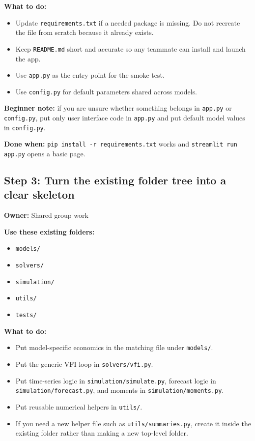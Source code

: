 \documentclass[11pt]{article}
\begin{document}
\textbf{What to do:}
\begin{itemize}
    \item Update \texttt{requirements.txt} if a needed package is missing. Do not recreate the file from scratch because it already exists.
    \item Keep \texttt{README.md} short and accurate so any teammate can install and launch the app.
    \item Use \texttt{app.py} as the entry point for the smoke test.
    \item Use \texttt{config.py} for default parameters shared across models.
\end{itemize}

\textbf{Beginner note:} if you are unsure whether something belongs in \texttt{app.py} or \texttt{config.py}, put only user interface code in \texttt{app.py} and put default model values in \texttt{config.py}.

\textbf{Done when:} \texttt{pip install -r requirements.txt} works and \texttt{streamlit run app.py} opens a basic page.

\subsection{Step 3: Turn the existing folder tree into a clear skeleton}
\textbf{Owner:} Shared group work

\textbf{Use these existing folders:}
\begin{itemize}
    \item \texttt{models/}
    \item \texttt{solvers/}
    \item \texttt{simulation/}
    \item \texttt{utils/}
    \item \texttt{tests/}
\end{itemize}

\textbf{What to do:}
\begin{itemize}
    \item Put model-specific economics in the matching file under \texttt{models/}.
    \item Put the generic VFI loop in \texttt{solvers/vfi.py}.
    \item Put time-series logic in \texttt{simulation/simulate.py}, forecast logic in \texttt{simulation/forecast.py}, and moments in \texttt{simulation/moments.py}.
    \item Put reusable numerical helpers in \texttt{utils/}.
    \item If you need a new helper file such as \texttt{utils/summaries.py}, create it inside the existing folder rather than making a new top-level folder.
\end{itemize}
\end{document}
